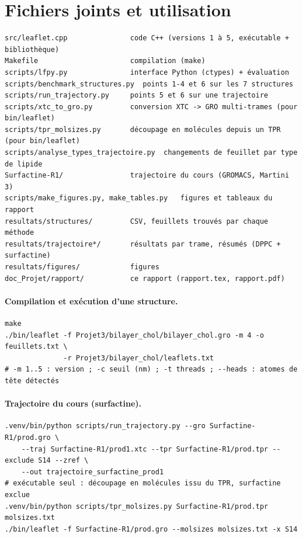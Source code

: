 \documentclass[11pt,a4paper]{article}
\begin{document}
\section*{Fichiers joints et utilisation}\label{sec:usage}
\begin{lstlisting}
src/leaflet.cpp               code C++ (versions 1 à 5, exécutable + bibliothèque)
Makefile                      compilation (make)
scripts/lfpy.py               interface Python (ctypes) + évaluation
scripts/benchmark_structures.py  points 1-4 et 6 sur les 7 structures
scripts/run_trajectory.py     points 5 et 6 sur une trajectoire
scripts/xtc_to_gro.py         conversion XTC -> GRO multi-trames (pour bin/leaflet)
scripts/tpr_molsizes.py       découpage en molécules depuis un TPR (pour bin/leaflet)
scripts/analyse_types_trajectoire.py  changements de feuillet par type de lipide
Surfactine-R1/                trajectoire du cours (GROMACS, Martini 3)
scripts/make_figures.py, make_tables.py   figures et tableaux du rapport
resultats/structures/         CSV, feuillets trouvés par chaque méthode
resultats/trajectoire*/       résultats par trame, résumés (DPPC + surfactine)
resultats/figures/            figures
doc_Projet/rapport/           ce rapport (rapport.tex, rapport.pdf)
\end{lstlisting}

\paragraph{Compilation et exécution d'une structure.}
\begin{lstlisting}
make
./bin/leaflet -f Projet3/bilayer_chol/bilayer_chol.gro -m 4 -o feuillets.txt \
              -r Projet3/bilayer_chol/leaflets.txt
# -m 1..5 : version ; -c seuil (nm) ; -t threads ; --heads : atomes de tête détectés
\end{lstlisting}

\paragraph{Trajectoire du cours (surfactine).}
\begin{lstlisting}
.venv/bin/python scripts/run_trajectory.py --gro Surfactine-R1/prod.gro \
    --traj Surfactine-R1/prod1.xtc --tpr Surfactine-R1/prod.tpr --exclude S14 --zref \
    --out trajectoire_surfactine_prod1
# exécutable seul : découpage en molécules issu du TPR, surfactine exclue
.venv/bin/python scripts/tpr_molsizes.py Surfactine-R1/prod.tpr molsizes.txt
./bin/leaflet -f Surfactine-R1/prod.gro --molsizes molsizes.txt -x S14
\end{lstlisting}
\end{document}
